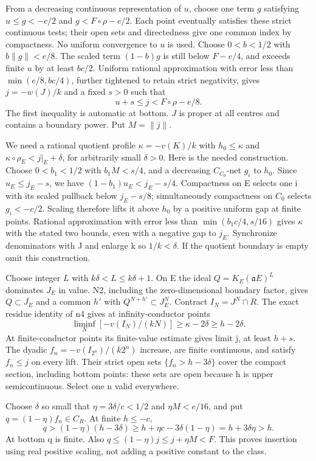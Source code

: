 \documentclass[11pt]{article}
\begin{document}
From a decreasing continuous representation of \(u\), choose one term \(g\) satisfying \(u\le g<-c/2\) and \(g<F\circ\rho-e/2\). Each point eventually satisfies these strict continuous tests; their open sets and directedness give one common index by compactness. No uniform convergence to \(u\) is used. Choose \(0<b<1/2\) with \(b\|g\|<e/8\). The scaled term \((1-b)g\) is still below \(F-e/4\), and exceeds finite \(u\) by at least \(bc/2\). Uniform rational approximation with error less than \(\min(e/8,bc/4)\), further tightened to retain strict negativity, gives \(j=-w(J)/k\) and a fixed \(s>0\) such that
\[
u+s\le j<F\circ\rho-e/8.
\]
The first inequality is automatic at bottom. \(J\) is proper at all centres and contains a boundary power. Put \(M=\|j\|\).

We need a rational quotient profile \(\kappa=-v(K)/k\) with \(h_0\le\kappa\) and \(\kappa\circ\rho_E<j|_E+\delta\), for arbitrarily small \(\delta>0\). Here is the needed construction. Choose \(0<b_1<1/2\) with \(b_1M<s/4\), and a decreasing \(C_{C_0}\)-net \(g_i\) to \(h_0\). Since \(u_E\le j_E-s\), we have \((1-b_1)u_E<j_E-s/4\). Compactness on E selects one i with its scaled pullback below \(j_E-s/8\); simultaneously compactness on \(C_0\) selects \(g_i<-c/2\). Scaling therefore lifts it above \(h_0\) by a positive uniform gap at finite points. Rational approximation with error less than \(\min(b_1c/4,s/16)\) gives \(\kappa\) with the stated two bounds, even with a negative gap to \(j_E\). Synchronize denominators with J and enlarge k so \(1/k<\delta\). If the quotient boundary is empty omit this construction.

Choose integer \(L\) with \(k\delta<L\le k\delta+1\). On E the ideal \(Q=K_E(\mathfrak aE)^L\) dominates \(J_E\) in value. N2, including the zero-dimensional boundary factor, gives \(Q\subset\overline{J_E}\) and a common \(h'\) with \(Q^{N+h'}\subset J_E^N\). Contract \(I_N=J^N\cap R\). The exact residue identity of n4 gives at infinity-conductor points
\[
\liminf_N[-v(I_N)/(kN)]\ge\kappa-2\delta\ge h-2\delta.
\]
At finite-conductor points its finite-value estimate gives limit j, at least \(h+s\). The dyadic \(f_n=-v(I_{2^n})/(k2^n)\) increase, are finite continuous, and satisfy \(f_n\le j\) on every lift. Their strict open sets \(\{f_n>h-3\delta\}\) cover the compact section, including bottom points: these sets are open because h is upper semicontinuous. Select one n valid everywhere.

Choose \(\delta\) so small that \(\eta=3\delta/c<1/2\) and \(\eta M<e/16\), and put \(q=(1-\eta)f_n\in C_R\). At finite \(h\le-c\),
\[
q>(1-\eta)(h-3\delta)\ge h+\eta c-3\delta(1-\eta)=h+3\delta\eta>h.
\]
At bottom q is finite. Also \(q\le(1-\eta)j\le j+\eta M<F\). This proves insertion using real positive scaling, not adding a positive constant to the class.
\end{document}
